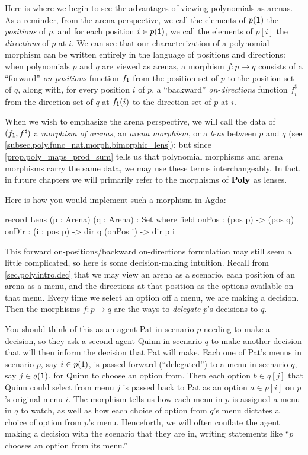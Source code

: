 \documentclass[Book-Poly]{subfiles}
\begin{document}
Here is where we begin to see the advantages of viewing polynomials as arenas.
As a reminder, from the arena perspective, we call the elements of $p(\textsf{1})$ the \emph{positions} of $p$, and for each position $i \in p(\textsf{1})$, we call the elements of $p[i]$ the \emph{directions} of $p$ at $i$.
We can see that our characterization of a polynomial morphism can be written entirely in the language of positions and directions: when polynomials $p$ and $q$ are viewed as arenas, a morphism $f \colon p \to q$ consists of a ``forward'' \emph{on-positions} function $f_{\textsf{1}}$ from the position-set of $p$ to the position-set of $q$, along with, for every position $i$ of $p$, a ``backward'' \emph{on-directions} function $f^\sharp_i$ from the direction-set of $q$ at $f_{\textsf{1}}(i)$ to the direction-set of $p$ at $i$.

When we wish to emphasize the arena perspective, we will call the data of $(f_{\textsf{1}}, f^\sharp)$ a \emph{morphism of arenas}, an \emph{arena morphism}, or a \emph{lens} between $p$ and $q$ (see \cref{subsec.poly.func_nat.morph.bimorphic_lens}); but since \cref{prop.poly_maps_prod_sum} tells us that polynomial morphisms and arena morphisms carry the same data, we may use these terms interchangeably.
In fact, in future chapters we will primarily refer to the morphisms of $\mathbf{Poly}$ as lenses.

Here is how you would implement such a morphism in Agda:
\begin{agda}
record Lens (p : Arena) (q : Arena) : Set where
   field
     onPos : (pos p) -> (pos q)
     onDir : (i : pos p) -> dir q (onPos i) -> dir p i
\end{agda}

This forward on-positions/backward on-directions formulation may still seem a little complicated, so here is some decision-making intuition.
Recall from \cref{sec.poly.intro.dec} that we may view an arena as a scenario, each position of an arena as a menu, and the directions at that position as the options available on that menu.
Every time we select an option off a menu, we are making a decision.
Then the morphisms $f\colon p\to q$ are the ways to \emph{delegate} $p$'s decisions to $q$.

You should think of this as an agent Pat in scenario $p$ needing to make a decision, so they ask a second agent Quinn in scenario $q$ to make another decision that will then inform the decision that Pat will make.
Each one of Pat's menus in scenario $p$, say $i\in p(\textsf{1})$, is passed forward (``delegated'') to a menu in scenario $q$, say $j\in q(\textsf{1})$, for Quinn to choose an option from.
Then each option $b\in q[j]$ that Quinn could select from menu $j$ is passed back to Pat as an option $a\in p[i]$ on $p$'s original menu $i$.
The morphism tells us how each menu in $p$ is assigned a menu in $q$ to watch, as well as how each choice of option from $q$'s menu dictates a choice of option from $p$'s menu.
Henceforth, we will often conflate the agent making a decision with the scenario that they are in, writing statements like ``$p$ chooses an option from its menu.''
\end{document}
